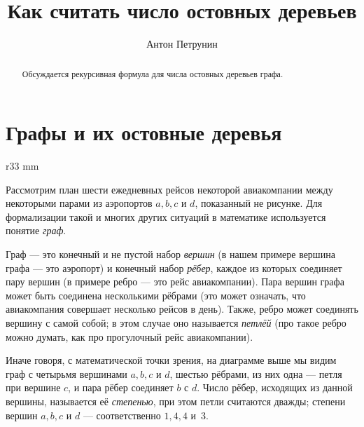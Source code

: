 \documentclass{article}
\begin{document}
\title{Как считать число остовных деревьев}
\author{Антон Петрунин}
\date{}
\maketitle

\begin{abstract}
Обсуждается рекурсивная формула для числа остовных деревьев графа.
\end{abstract}



\section{Графы и их остовные деревья}

\begin{wrapfigure}{r}{33 mm}
\vskip-4mm
\end{wrapfigure}

Рассмотрим план шести ежедневных рейсов некоторой авиакомпании между некоторыми парами из аэропортов $a,b,c$ и $d$,
показанный не рисунке.
Для формализации такой и многих других ситуаций в математике используется понятие \emph{граф}.

Граф --- это конечный и не пустой набор \emph{вершин} (в нашем примере вершина графа --- это аэропорт) 
и конечный набор \emph{рёбер}, каждое из которых соединяет пару вершин (в примере ребро --- это рейс авиакомпании).
Пара вершин графа может быть соединена несколькими рёбрами (это может означать, что авиакомпания совершает несколько рейсов в день). 
Также, ребро может соединять вершину с самой собой; в этом случае оно называется \emph{петлёй} (про такое ребро можно думать, как про прогулочный рейс авиакомпании).

Иначе говоря, с математической точки зрения, на диаграмме выше мы видим граф с четырьмя вершинами $a,b,c$ и $d$, 
шестью рёбрами, из них
одна --- петля при вершине $c$, и пара рёбер соединяет $b$ с $d$.
Число рёбер, исходящих из данной вершины, называется её \emph{степенью}, при этом петли считаются дважды;
степени вершин $a,b,c$ и $d$ --- соответственно $1,4,4$ и~$3$.
\end{document}
